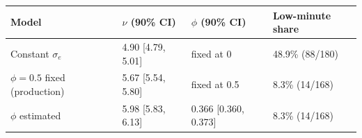 
\begin{tabular}{llll}
\toprule
Model & $\nu$ (90\% CI) & $\phi$ (90\% CI) & Low-minute share\\
\midrule
Constant $\sigma_e$ & 4.90 [4.79, 5.01] & fixed at 0 & 48.9\% (88/180)\\
$\phi=0.5$ fixed (production) & 5.67 [5.54, 5.80] & fixed at 0.5 & 8.3\% (14/168)\\
$\phi$ estimated & 5.98 [5.83, 6.13] & 0.366 [0.360, 0.373] & 8.3\% (14/168)\\
\bottomrule
\end{tabular}
